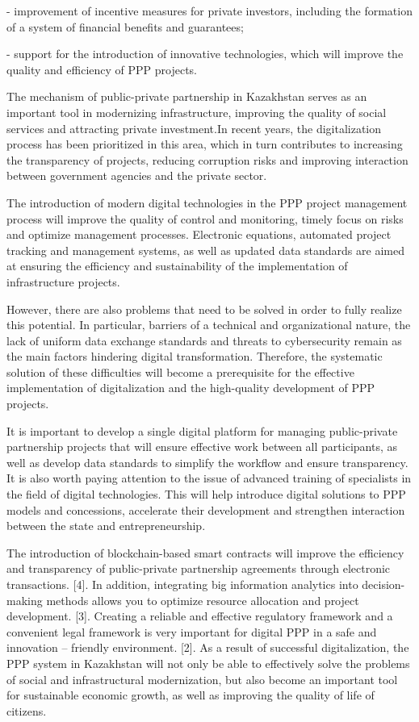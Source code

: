 \begin{multicols}{2}
- improvement of incentive measures for private investors, including the
formation of a system of financial benefits and guarantees;

- support for the introduction of innovative technologies, which will
improve the quality and efficiency of PPP projects.

The mechanism of public-private partnership in Kazakhstan serves as an
important tool in modernizing infrastructure, improving the quality of
social services and attracting private investment.In recent years, the
digitalization process has been prioritized in this area, which in turn
contributes to increasing the transparency of projects, reducing
corruption risks and improving interaction between government agencies
and the private sector.

The introduction of modern digital technologies in the PPP project
management process will improve the quality of control and monitoring,
timely focus on risks and optimize management processes. Electronic
equations, automated project tracking and management systems, as well as
updated data standards are aimed at ensuring the efficiency and
sustainability of the implementation of infrastructure projects.

However, there are also problems that need to be solved in order to
fully realize this potential. In particular, barriers of a technical and
organizational nature, the lack of uniform data exchange standards and
threats to cybersecurity remain as the main factors hindering digital
transformation. Therefore, the systematic solution of these difficulties
will become a prerequisite for the effective implementation of
digitalization and the high-quality development of PPP projects.

It is important to develop a single digital platform for managing
public-private partnership projects that will ensure effective work
between all participants, as well as develop data standards to simplify
the workflow and ensure transparency. It is also worth paying attention
to the issue of advanced training of specialists in the field of digital
technologies. This will help introduce digital solutions to PPP models
and concessions, accelerate their development and strengthen interaction
between the state and entrepreneurship.

The introduction of blockchain-based smart contracts will improve the
efficiency and transparency of public-private partnership agreements
through electronic transactions. {[}4{]}. In addition, integrating big
information analytics into decision-making methods allows you to
optimize resource allocation and project development. {[}3{]}. Creating
a reliable and effective regulatory framework and a convenient legal
framework is very important for digital PPP in a safe and innovation --
friendly environment. {[}2{]}. As a result of successful digitalization,
the PPP system in Kazakhstan will not only be able to effectively solve
the problems of social and infrastructural modernization, but also
become an important tool for sustainable economic growth, as well as
improving the quality of life of citizens.


\end{multicols}
